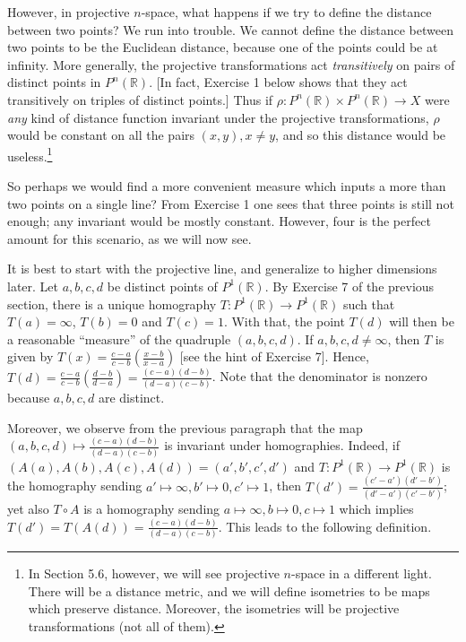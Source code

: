 \documentclass[leqno]{book}
\begin{document}
However, in projective $n$-space, what happens if we try to define the distance between two points?  We run into trouble.  We cannot define the distance between two points to be the Euclidean distance, because one of the points could be at infinity.  More generally, the projective transformations act \emph{transitively} on pairs of distinct points in $P^n(\mathbb R)$.  [In fact, Exercise 1 below shows that they act transitively on triples of distinct points.]  Thus if $\rho:P^n(\mathbb R)\times P^n(\mathbb R)\to X$ were \emph{any} kind of distance function invariant under the projective transformations, $\rho$ would be constant on all the pairs $(x,y),x\ne y$, and so this distance would be useless.\footnote{In Section 5.6, however, we will see projective $n$-space in a different light.  There will be a distance metric, and we will define isometries to be maps which preserve distance.  Moreover, the isometries will be projective transformations (not all of them).}

So perhaps we would find a more convenient measure which inputs a more than two points on a single line?  From Exercise 1 one sees that three points is still not enough; any invariant would be mostly constant.  However, four is the perfect amount for this scenario, as we will now see.

It is best to start with the projective line, and generalize to higher dimensions later.  Let $a,b,c,d$ be distinct points of $P^1(\mathbb R)$.  By Exercise 7 of the previous section, there is a unique homography $T:P^1(\mathbb R)\to P^1(\mathbb R)$ such that $T(a)=\infty$, $T(b)=0$ and $T(c)=1$.  With that, the point $T(d)$ will then be a reasonable ``measure'' of the quadruple $(a,b,c,d)$.  If $a,b,c,d\ne\infty$, then $T$ is given by $T(x)=\frac{c-a}{c-b}\left(\frac{x-b}{x-a}\right)$ [see the hint of Exercise 7].  Hence, $T(d)=\frac{c-a}{c-b}\left(\frac{d-b}{d-a}\right)=\frac{(c-a)(d-b)}{(d-a)(c-b)}$.  Note that the denominator is nonzero because $a,b,c,d$ are distinct.

Moreover, we observe from the previous paragraph that the map $(a,b,c,d)\mapsto\frac{(c-a)(d-b)}{(d-a)(c-b)}$ is invariant under homographies.  Indeed, if $(A(a),A(b),A(c),A(d))=(a',b',c',d')$ and $T:P^1(\mathbb R)\to P^1(\mathbb R)$ is the homography sending $a'\mapsto\infty,b'\mapsto 0,c'\mapsto 1$, then $T(d')=\frac{(c'-a')(d'-b')}{(d'-a')(c'-b')}$; yet also $T\circ A$ is a homography sending $a\mapsto\infty,b\mapsto 0,c\mapsto 1$ which implies $T(d')=T(A(d))=\frac{(c-a)(d-b)}{(d-a)(c-b)}$.  This leads to the following definition.\\
\end{document}
